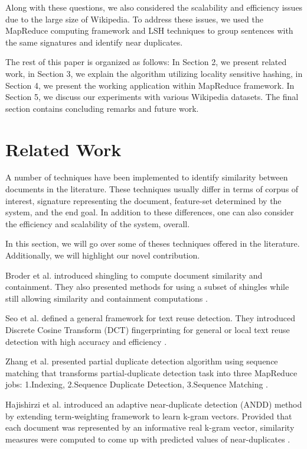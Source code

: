 \documentclass{acm_proc_article-sp}
\begin{document}
Along with these questions, we also considered the scalability and efficiency issues due to the large size of Wikipedia. To address these issues, we used the MapReduce computing framework and LSH techniques to group sentences with the same signatures and identify near duplicates.

The rest of this paper is organized as follows: In Section 2, we present related work, in Section 3, we explain the algorithm utilizing locality sensitive hashing, in Section 4, we present the working application within MapReduce framework. In Section 5, we discuss our experiments with various Wikipedia datasets. The final section contains concluding remarks and future work.

\section{Related Work}
A number of techniques have been implemented to identify similarity between documents in the literature. These techniques usually differ in terms of corpus of interest, signature representing the document, feature-set determined by the system, and the end goal. In addition to these differences, one can also consider the efficiency and scalability of the system, overall. 

In this section, we will go over some of theses techniques offered in the literature. Additionally, we will highlight our novel contribution.

Broder et al. introduced shingling to compute document similarity and containment. They also presented methods for using a subset of shingles while still allowing similarity and containment computations \cite{broder:resemblance}.

Seo et al. defined a general framework for text reuse detection. They introduced Discrete Cosine Transform (DCT) fingerprinting for general or local text reuse detection with high accuracy and efficiency \cite{seo:dct}.

Zhang et al. presented partial duplicate detection algorithm using sequence matching that transforms partial-duplicate detection task into three MapReduce jobs: 1.Indexing, 2.Sequence Duplicate Detection, 3.Sequence Matching \cite{zhang:pdc}.

Hajishirzi et al. introduced an adaptive near-duplicate detection (ANDD) method by extending term-weighting framework to learn k-gram vectors. Provided that each document was represented by an informative real k-gram vector, similarity measures were computed to come up with predicted values of near-duplicates \cite{hajishirzi:andd}.
\end{document}
